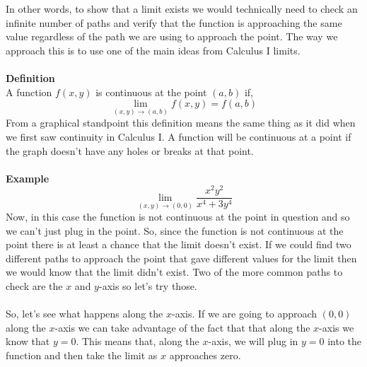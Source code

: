 \documentclass[10pt,reqno]{book}
\theoremstyle{definition}
\begin{document}
	 \begin{center}
	 \end{center}
 	In other words, to show that a limit exists we would technically need to check an infinite number of paths and verify that the function is approaching the same value regardless of the path we are using to approach the point. The way we approach this is to use one of the main ideas from Calculus I limits.\\ \\
 	\textbf{Definition}\\
 	A function $ f(x,y) $ is continuous at the point $ (a,b) $ if,
 	\[ \lim_{(x,y) \to (a,b)} f(x,y) = f(a,b) \]
 	From a graphical standpoint this definition means the same thing as it did when we first saw continuity in Calculus I. A function will be continuous at a point if the graph doesn't have any holes or breaks at that point.\\ \\
 	\textbf{Example}\\
 	\[ \lim_{(x,y) \to (0,0)} \frac{x^2 y^2}{x^4 + 3y^4} \]
	Now, in this case the function is not continuous at the point in question and so we can't just plug in the point. So, since the function is not continuous at the point there is at least a chance that the limit doesn't exist. If we could find two different paths to approach the point that gave different values for the limit then we would know that the limit didn't exist. Two of the more common paths to check are the $ x $ and $ y $-axis so let's try those.\\ \\
	So, let's see what happens along the $ x $-axis. If we are going to approach $ (0,0) $ along the $ x $-axis we can take advantage of the fact that that along the $ x $-axis we know that $ y = 0 $. This means that, along the $ x $-axis, we will plug in $ y = 0 $ into the function and then take the limit as $ x $ approaches zero.
\end{document}
